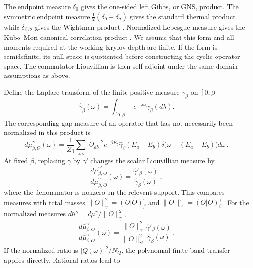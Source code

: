 \documentclass[a4paper,11pt]{article}
\def\dd{d}%
\def\ee{e}%
\theoremstyle{definition}
\theoremstyle{remark}
\newcommand{\dd}{\mathrm d}
\newcommand{\ee}{\mathrm e}
\begin{document}
The endpoint measure $\delta_0$ gives the one-sided left Gibbs, or GNS, product.  The symmetric
endpoint measure $\tfrac12(\delta_0+\delta_\beta)$ gives the standard thermal product, while
$\delta_{\beta/2}$ gives the Wightman product \cite{TanWeiZhang2024}.  Normalized Lebesgue measure
gives the Kubo--Mori canonical-correlation product \cite{Kubo1957CanonicalCorrelation}.
We assume that this form
and all moments required at the working Krylov depth are finite.  If the
form is semidefinite, its null space is quotiented before constructing
the cyclic operator space.  The commutator Liouvillian is then
self-adjoint under the same domain assumptions as above.

Define the Laplace transform of the finite positive measure $\gamma_\beta$ on $[0,\beta]$
\begin{equation}
   \widehat\gamma_\beta(\omega)
   =\int_{[0,\beta]}
      \ee^{-\lambda\omega}\gamma_\beta(\dd\lambda).
\end{equation}
The corresponding gap measure of an operator that has not necessarily
been normalized in this product is
\begin{equation}
   \dd\mu^\gamma_{\beta,O}(\omega)
   =\frac{1}{Z_\beta}\sum_{a,b}|O_{ab}|^2
      \ee^{-\beta E_b}
      \widehat\gamma_\beta(E_a-E_b)
      \delta\!\bigl(\omega-(E_a-E_b)\bigr)\dd\omega\,.
   \label{eq:thermal-gap-measure-app}
\end{equation}
At fixed $\beta$, replacing $\gamma$ by $\gamma'$ changes the scalar
Liouvillian measure by
\begin{equation}
   \frac{\dd\mu^{\gamma'}_{\beta,O}}
        {\dd\mu^{\gamma}_{\beta,O}}(\omega)
   =\frac{\widehat\gamma'_\beta(\omega)}
          {\widehat\gamma_\beta(\omega)}\,,
   \label{eq:fixed-beta-relative-density-app}
\end{equation}
where the denominator is nonzero on the relevant support.  This compares
measures with total masses
$\|O\|_\gamma^2=(O|O)^\gamma_\beta$ and
$\|O\|_{\gamma'}^2=(O|O)^{\gamma'}_\beta$.  For the normalized measures
$\dd\bar\mu^\gamma=\dd\mu^\gamma/\|O\|_\gamma^2$,
\begin{equation}
   \frac{\dd\bar\mu^{\gamma'}_{\beta,O}}
        {\dd\bar\mu^{\gamma}_{\beta,O}}(\omega)
   =\frac{\|O\|_\gamma^2}{\|O\|_{\gamma'}^2}
      \frac{\widehat\gamma'_\beta(\omega)}
           {\widehat\gamma_\beta(\omega)}\,.
   \label{eq:fixed-beta-normalized-relative-density-app}
\end{equation}
If the normalized ratio is $|Q(\omega)|^2/N_Q$, the polynomial
finite-band transfer applies directly.  Rational ratios lead to
\end{document}
